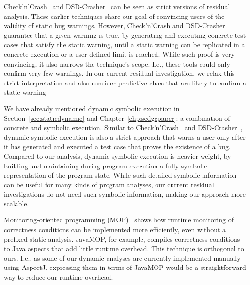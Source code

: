 Check'n'Crash~\cite{csallner05check} and DSD-Crasher~\cite{csallner06dsd-crasher,smaragdakis07combining} can be seen as strict versions of residual analysis. These earlier techniques share our goal of convincing users of the validity of static bug warnings. However, Check'n'Crash and DSD-Crasher guarantee that a given warning is true, by generating and executing concrete test cases that satisfy the static warning, until a static warning can be replicated in a concrete execution or a user-defined limit is reached. While such proof is very convincing, it also narrows the technique's scope. I.e., these tools could only confirm very few warnings. In our current residual investigation, we relax this strict interpretation and also consider predictive clues that are likely to confirm a static warning.

We have already mentioned dynamic symbolic execution in Section~\ref{sec:staticdynamic} and Chapter~\ref{chp:sedgepaper}: a combination of concrete and symbolic execution. Similar to Check'n'Crash~\cite{csallner05check} and DSD-Crasher~\cite{csallner06dsd-crasher,smaragdakis07combining}, dynamic symbolic execution is also a strict approach that warns a user only after it has generated and executed a test case that proves the
existence of a bug. Compared to our analysis, dynamic symbolic
execution is heavier-weight, by building and maintaining
during program execution a fully symbolic representation of the
program state. While such detailed symbolic information can be useful
for many kinds of program analyses, our current residual
investigations do not need such symbolic information, making our
approach more scalable.

Monitoring-oriented programming (MOP)~\cite{chen07mop} shows how
runtime monitoring of correctness conditions can be implemented more
efficiently, even without a prefixed static analysis. JavaMOP, for
example, compiles correctness conditions to Java aspects that add
little runtime overhead. This technique is orthogonal to ours. I.e.,
as some of our dynamic analyses are currently implemented manually
using AspectJ, expressing them in terms of JavaMOP would be a
straightforward way to reduce our runtime overhead.

